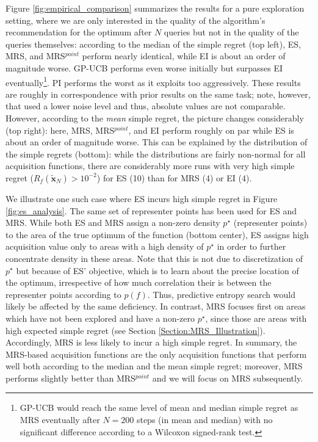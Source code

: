 \documentclass[10pt,letterpaper]{article} %
\begin{document}
Figure \ref{fig:empirical_comparison} summarizes the results for a pure
exploration setting, where we are only interested in the quality of the
algorithm's recommendation for the optimum after $N$ queries but not in the
quality of the queries themselves:  according to the
median of the simple regret (top left), ES, MRS, and MRS$^{point}$ perform
nearly identical, while EI is about an order of magnitude worse. GP-UCB performs
even worse initially but surpasses EI eventually\footnote{GP-UCB would reach 
the same level of mean and median simple regret as MRS eventually after $N=200$ steps 
(in mean and median) with no significant difference  according to a Wilcoxon signed-rank test.}. 
PI performs the worst as it
exploits too aggressively. These results are roughly in correspondence with prior
results \cite{hennig_entropy_2012,hernandez-lobato_predictive_2014} on the same
task; note, however, that \citet{hernandez-lobato_predictive_2014} used a lower
noise level and thus, absolute values are not comparable. However, according to
the \emph{mean} simple regret, the picture changes considerably (top right):
here, MRS, MRS$^{point}$, and EI perform roughly on par while ES is about an order of
magnitude worse. This can be explained by the distribution of the simple
regrets (bottom): while the distributions are fairly non-normal for all
acquisition functions, there are considerably more runs with very high simple
regret ($R_f(\mathbf{\tilde x}_N)>10^{-2}$) for ES (10) than for MRS (4) or EI (4).

We illustrate one such case where ES incurs high simple regret in Figure
\ref{fig:es_analysis}. The same set of representer points has been used for ES and MRS.
While both ES and MRS assign a non-zero density $p^\star$
(representer points) to the area of the true optimum of the function
(bottom center), ES assigns high acquisition value only to areas with a high
density of $p^\star$ in order to further concentrate density in these areas.
Note that this is not due to discretization of $p^\star$ but because of ES'
objective, which is to learn about the precise location of the optimum, irrespective of
how much correlation their is between the representer points according to $p(f)$.
Thus, predictive entropy search \cite{hernandez-lobato_predictive_2014} would likely be affected by the
same deficiency. In contrast, MRS focuses first on areas which have not been
explored and have a non-zero $p^\star$, since those are areas with high expected
simple regret (see Section \ref{Section:MRS_Illustration}). Accordingly, MRS is less likely to incur a high simple regret. In summary, the MRS-based acquisition functions are the only
acquisition functions that perform well both according to the median and the
mean simple regret; moreover, MRS performs slightly better than
MRS$^{point}$ and we will focus on MRS subsequently.
\end{document}
